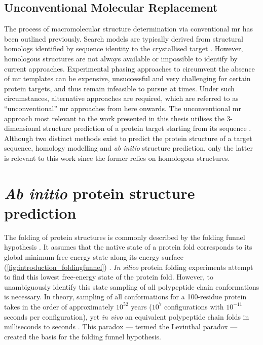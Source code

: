 \subsection{Unconventional Molecular Replacement}
The process of macromolecular structure determination via conventional \gls{mr} has been outlined previously. Search models are typically derived from structural homologs identified by sequence identity to the crystallised target \cite{Rupp2010-nc}. However, homologous structures are not always available or impossible to identify by current approaches. Experimental phasing approaches to circumvent the absence of \gls{mr} templates can be expensive, unsuccessful and very challenging for certain protein targets, and thus remain infeasible to pursue at times. Under such circumstances, alternative approaches are required, which are referred to as ``unconventional'' \gls{mr} approaches from here onwards. The unconventional \gls{mr} approach most relevant to the work presented in this thesis utilises the 3-dimensional structure prediction of a protein target starting from its sequence \cite{Qian2007-vo,Rigden2008-vo,Das2009-uz}. Although two distinct methods exist to predict the protein structure of a target sequence, homology modelling and \textit{ab initio} structure prediction, only the latter is relevant to this work since the former relies on homologous structures.
 
\section{\textit{Ab initio} protein structure prediction} \label{sec:introduction_structure_prediction}
The folding of protein structures is commonly described by the folding funnel hypothesis \cite{Leopold1992-yf}. It assumes that the native state of a protein fold corresponds to its global minimum free-energy state along its energy surface (\cref{fig:introduction_foldingfunnel}) \cite{Anfinsen1973-in}. \textit{In silico} protein folding experiments attempt to find this lowest free-energy state of the protein fold. However, to unambiguously identify this state sampling of all polypeptide chain conformations is necessary. In theory, sampling of all conformations for a 100-residue protein takes in the order of approximately $10^{52}$ years ($10^7$ configurations with $10^{-11}$ seconds per configuration), yet \textit{in vivo} an equivalent polypeptide chain folds in milliseconds to seconds \cite{Levinthal1969-bn,Karplus2011-jh}. This paradox --- termed the Levinthal paradox \cite{Levinthal1969-bn} --- created the basis for the folding funnel hypothesis.  

